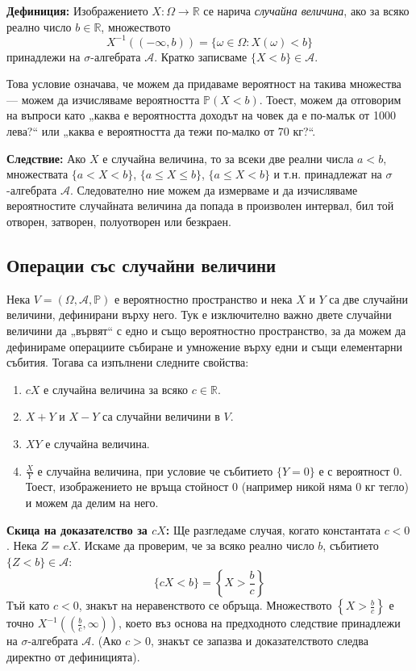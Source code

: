 \documentclass{article}
\begin{document}
\textbf{Дефиниция:} Изображението $X: \Omega \rightarrow \mathbb{R}$ се нарича \textit{случайна величина}, ако за всяко реално число $b \in \mathbb{R}$, множеството 
\[ X^{-1}((-\infty, b)) = \{ \omega \in \Omega : X(\omega) < b \} \]
принадлежи на $\sigma$-алгебрата $\mathcal{A}$. Кратко записваме $\{ X < b \} \in \mathcal{A}$.

Това условие означава, че можем да придаваме вероятност на такива множества — можем да изчисляваме вероятността $\mathbb{P}(X < b)$. Тоест, можем да отговорим на въпроси като „каква е вероятността доходът на човек да е по-малък от 1000 лева?“ или „каква е вероятността да тежи по-малко от 70 кг?“.

\textbf{Следствие:} Ако $X$ е случайна величина, то за всеки две реални числа $a < b$, множествата $\{ a < X < b \}$, $\{ a \le X \le b \}$, $\{ a \le X < b \}$ и т.н. принадлежат на $\sigma$-алгебрата $\mathcal{A}$. Следователно ние можем да измерваме и да изчисляваме вероятностите случайната величина да попада в произволен интервал, бил той отворен, затворен, полуотворен или безкраен.

\subsection{Операции със случайни величини}
Нека $V = (\Omega, \mathcal{A}, \mathbb{P})$ е вероятностно пространство и нека $X$ и $Y$ са две случайни величини, дефинирани върху него. Тук е изключително важно двете случайни величини да „вървят“ с едно и също вероятностно пространство, за да можем да дефинираме операциите събиране и умножение върху едни и същи елементарни събития. Тогава са изпълнени следните свойства:
\begin{enumerate}
    \item $c X$ е случайна величина за всяко $c \in \mathbb{R}$.
    \item $X + Y$ и $X - Y$ са случайни величини в $V$.
    \item $X Y$ е случайна величина.
    \item $\frac{X}{Y}$ е случайна величина, при условие че събитието $\{Y = 0\}$ е с вероятност 0. Тоест, изображението не връща стойност 0 (например никой няма 0 кг тегло) и можем да делим на него.
\end{enumerate}

\textbf{Скица на доказателство за $c X$:} 
Ще разгледаме случая, когато константата $c < 0$. Нека $Z = c X$. Искаме да проверим, че за всяко реално число $b$, събитието $\{ Z < b \} \in \mathcal{A}$:
\[ \{ c X < b \} = \left\{ X > \frac{b}{c} \right\} \]
Тъй като $c < 0$, знакът на неравенството се обръща. Множеството $\left\{ X > \frac{b}{c} \right\}$ е точно $X^{-1}\left(\left(\frac{b}{c}, \infty\right)\right)$, което въз основа на предходното следствие принадлежи на $\sigma$-алгебрата $\mathcal{A}$. (Ако $c > 0$, знакът се запазва и доказателството следва директно от дефиницията).
\end{document}
